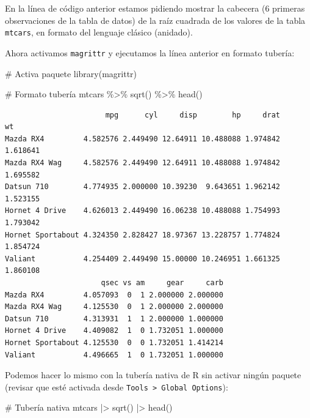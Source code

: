 \documentclass[
  spanish,
  a4paper,
]{scrbook}
\newenvironment{Shaded}{\begin{snugshade}}{\end{snugshade}}
\newcommand{\CommentTok}[1]{\textcolor[rgb]{0.37,0.37,0.37}{#1}}
\newcommand{\FunctionTok}[1]{\textcolor[rgb]{0.28,0.35,0.67}{#1}}
\newcommand{\NormalTok}[1]{\textcolor[rgb]{0.00,0.23,0.31}{#1}}
\newcommand{\SpecialCharTok}[1]{\textcolor[rgb]{0.37,0.37,0.37}{#1}}
\begin{document}
En la línea de código anterior estamos pidiendo mostrar la cabecera (6
primeras observaciones de la tabla de datos) de la raíz cuadrada de los
valores de la tabla \texttt{mtcars}, en formato del lenguaje clásico
(anidado).

Ahora activamos \texttt{magrittr} y ejecutamos la línea anterior en
formato tubería:

\begin{Shaded}
\begin{Highlighting}[]
\CommentTok{\# Activa paquete}
\FunctionTok{library}\NormalTok{(magrittr)}

\CommentTok{\# Formato tubería}
\NormalTok{mtcars }\SpecialCharTok{\%\textgreater{}\%}
  \FunctionTok{sqrt}\NormalTok{() }\SpecialCharTok{\%\textgreater{}\%}
  \FunctionTok{head}\NormalTok{()}
\end{Highlighting}
\end{Shaded}

\begin{verbatim}
                       mpg      cyl     disp        hp     drat       wt
Mazda RX4         4.582576 2.449490 12.64911 10.488088 1.974842 1.618641
Mazda RX4 Wag     4.582576 2.449490 12.64911 10.488088 1.974842 1.695582
Datsun 710        4.774935 2.000000 10.39230  9.643651 1.962142 1.523155
Hornet 4 Drive    4.626013 2.449490 16.06238 10.488088 1.754993 1.793042
Hornet Sportabout 4.324350 2.828427 18.97367 13.228757 1.774824 1.854724
Valiant           4.254409 2.449490 15.00000 10.246951 1.661325 1.860108
                      qsec vs am     gear     carb
Mazda RX4         4.057093  0  1 2.000000 2.000000
Mazda RX4 Wag     4.125530  0  1 2.000000 2.000000
Datsun 710        4.313931  1  1 2.000000 1.000000
Hornet 4 Drive    4.409082  1  0 1.732051 1.000000
Hornet Sportabout 4.125530  0  0 1.732051 1.414214
Valiant           4.496665  1  0 1.732051 1.000000
\end{verbatim}

Podemos hacer lo mismo con la tubería nativa de R sin activar ningún
paquete (revisar que esté activada desde
\texttt{Tools\ \textgreater{}\ Global\ Options}):

\begin{Shaded}
\begin{Highlighting}[]
\CommentTok{\# Tubería nativa}
\NormalTok{mtcars }\SpecialCharTok{|\textgreater{}}
  \FunctionTok{sqrt}\NormalTok{() }\SpecialCharTok{|\textgreater{}}
  \FunctionTok{head}\NormalTok{()}
\end{Highlighting}
\end{Shaded}
\end{document}
